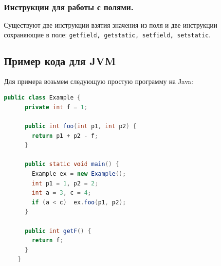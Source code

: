 \subsubsection{Инструкции для работы с полями.}
Существуют две инструкции взятия значения из поля и две инструкции сохраняющие в поле: \texttt{getfield, getstatic, setfield, setstatic}.

\subsection{Пример кода для JVM}

Для примера возьмем следующую простую программу на Java:

\begin{lstlisting}[language = Java]
    public class Example {
      private int f = 1; 

      public int foo(int p1, int p2) {
        return p1 + p2 - f;
      }

      public static void main() {
        Example ex = new Example();
        int p1 = 1, p2 = 2;
        int a = 3, c = 4;
        if (a < c)  ex.foo(p1, p2);
      }

      public int getF() {
        return f;
      }
    }
\end{lstlisting}

